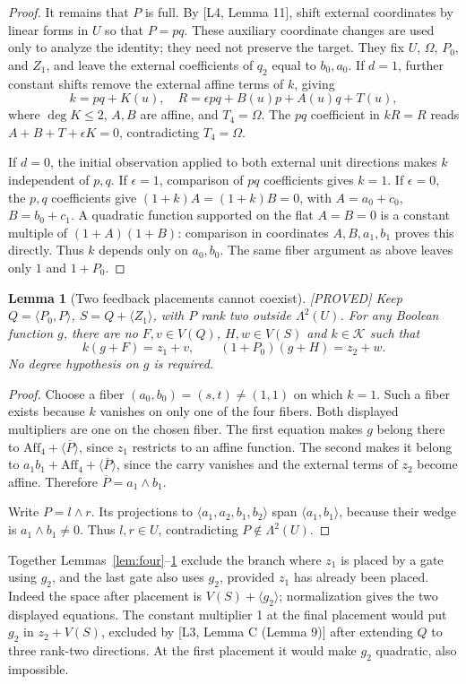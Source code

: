 \documentclass[11pt,a4paper]{article}
\newtheorem{lemma}[theorem]{Lemma}
\newcommand{\Aff}{\mathrm{Aff}}
\newcommand{\status}[1]{\hfill\textsf{[#1]}}
\begin{document}
\begin{proof}
It remains that $P$ is full. By [L4, Lemma 11], shift external coordinates by linear forms in $U$ so that $P=pq$. These auxiliary coordinate changes are used only to analyze the identity; they need not preserve the target. They fix $U$, $\Omega$, $P_0$, and $Z_1$, and leave the external coefficients of $q_2$ equal to $b_0,a_0$. If $d=1$, further constant shifts remove the external affine terms of $k$, giving
\[
k=pq+K(u),\quad R=\epsilon pq+B(u)p+A(u)q+T(u),
\]
where $\deg K\le2$, $A,B$ are affine, and $T_4=\Omega$. The $pq$ coefficient in $kR=R$ reads $A+B+T+\epsilon K=0$, contradicting $T_4=\Omega$.

If $d=0$, the initial observation applied to both external unit directions makes $k$ independent of $p,q$. If $\epsilon=1$, comparison of $pq$ coefficients gives $k=1$. If $\epsilon=0$, the $p,q$ coefficients give $(1+k)A=(1+k)B=0$, with $A=a_0+c_0$, $B=b_0+c_1$. A quadratic function supported on the flat $A=B=0$ is a constant multiple of $(1+A)(1+B)$: comparison in coordinates $A,B,a_1,b_1$ proves this directly. Thus $k$ depends only on $a_0,b_0$. The same fiber argument as above leaves only $1$ and $1+P_0$.
\end{proof}

\begin{lemma}[Two feedback placements cannot coexist]\label{lem:two}\status{PROVED}
Keep $Q=\langle P_0,P\rangle$, $S=Q+\langle Z_1\rangle$, with $P$ rank two outside $\Lambda^2(U)$. For any Boolean function $g$, there are no $F,v\in V(Q)$, $H,w\in V(S)$ and $k\in\mathcal K$ such that
\[
k(g+F)=z_1+v,\qquad (1+P_0)(g+H)=z_2+w.
\]
No degree hypothesis on $g$ is required.
\end{lemma}
\begin{proof}
Choose a fiber $(a_0,b_0)=(s,t)\ne(1,1)$ on which $k=1$. Such a fiber exists because $k$ vanishes on only one of the four fibers. Both displayed multipliers are one on the chosen fiber. The first equation makes $g$ belong there to $\Aff_4+\langle\overline P\rangle$, since $z_1$ restricts to an affine function. The second makes it belong to $a_1b_1+\Aff_4+\langle\overline P\rangle$, since the carry vanishes and the external terms of $z_2$ become affine. Therefore $\overline P=a_1\wedge b_1$.

Write $P=l\wedge r$. Its projections to $\langle a_1,a_2,b_1,b_2\rangle$ span $\langle a_1,b_1\rangle$, because their wedge is $a_1\wedge b_1\ne0$. Thus $l,r\in U$, contradicting $P\notin\Lambda^2(U)$.
\end{proof}
Together Lemmas~\ref{lem:four}--\ref{lem:two} exclude the branch where $z_1$ is placed by a gate using $g_2$, and the last gate also uses $g_2$, provided $z_1$ has already been placed. Indeed the space after placement is $V(S)+\langle g_2\rangle$; normalization gives the two displayed equations. The constant multiplier 1 at the final placement would put $g_2$ in $z_2+V(S)$, excluded by [L3, Lemma C (Lemma 9)] after extending $Q$ to three rank-two directions. At the first placement it would make $g_2$ quadratic, also impossible.
\end{document}
